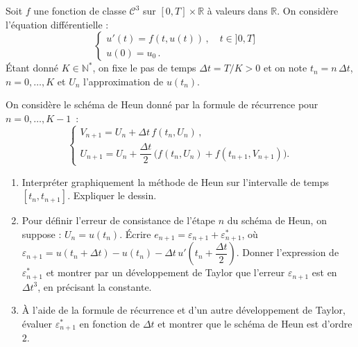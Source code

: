 \documentclass[a4paper,12pt,reqno]{amsart}
\begin{document}
\begin{exo}

  Soit $f$ une fonction de classe ${\mathcal{C}}^3$ sur $[0,T] \times \mathbb{R}$ à valeurs dans $\mathbb{R}$. On considère l'équation différentielle :
  \begin{equation}\label{equ1}
    \begin{cases}
      u'(t)=f(t,u(t)) \,, \quad t \in ]0,T] & \\
      u(0)=u_0 \,.
    \end{cases}
  \end{equation}
  Étant donné $K \in \mathbb{N}^*$, on fixe le pas de temps $\Delta t=T/K > 0$ et on note $t_n = n\, \Delta t$, $n = 0, \ldots, K$ et $U_n$  l'approximation de $u(t_n)$.

  On considère le schéma de Heun donné par la formule de récurrence pour $n=0,\dots, K-1$~:
  \[
    \begin{cases}
      V_{n+1} = U_n + \Delta t \, f(t_n,U_n) \,, \\
      U_{n+1} = U_n + \dfrac{\Delta t}{2} \, \big( f(t_n,U_n) + f(t_{n+1},V_{n+1}) \big) .
    \end{cases}
  \]
  \begin{enumerate}
    \item Interpréter graphiquement la méthode de Heun sur l'intervalle de temps $[t_n, t_{n+1}]$. Expliquer le dessin.

    \item Pour définir l'erreur de consistance de l'étape $n$ du schéma de Heun, on suppose : $U_n=u(t_n)$. Écrire $e_{n+1} = \varepsilon_{n+1} + \varepsilon_{n+1}^*$, où
    $\varepsilon_{n+1} = u(t_n+\Delta t) -u(t_n) - \Delta t \,u'(t_n + \dfrac{\Delta t}{2})$. Donner l'expression de $\varepsilon_{n+1}^*$ et montrer par un développement de Taylor que l'erreur $\varepsilon_{n+1}$ est en $\Delta t^3$, en précisant la constante.

    \item À l'aide de la formule de récurrence et d'un autre développement de Taylor, évaluer $\varepsilon_{n+1}^*$ en fonction de $\Delta t$ et montrer que le schéma de Heun est d'ordre $2$.

  \end{enumerate}

\end{exo}
\end{document}
